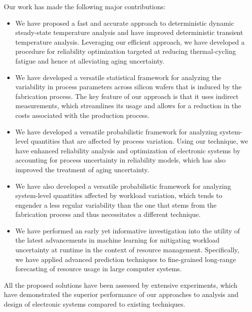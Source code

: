 Our work has made the following major contributions:

\begin{itemize}

\item
We have proposed a fast and accurate approach to deterministic dynamic
steady-state temperature analysis and have improved deterministic transient
temperature analysis. Leveraging our efficient approach, we have developed a
procedure for reliability optimization targeted at reducing thermal-cycling
fatigue and hence at alleviating aging uncertainty.

\item
We have developed a versatile statistical framework for analyzing the
variability in process parameters across silicon wafers that is induced by the
fabrication process. The key feature of our approach is that it uses indirect
measurements, which streamlines its usage and allows for a reduction in the
costs associated with the production process.

\item
We have developed a versatile probabilistic framework for analyzing system-level
quantities that are affected by process variation. Using our technique, we have
enhanced reliability analysis and optimization of electronic systems by
accounting for process uncertainty in reliability models, which has also
improved the treatment of aging uncertainty.

\item
We have also developed a versatile probabilistic framework for analyzing
system-level quantities affected by workload variation, which tends to engender
a less regular variability than the one that stems from the fabrication process
and thus necessitates a different technique.

\item
We have performed an early yet informative investigation into the utility of the
latest advancements in machine learning for mitigating workload uncertainty at
runtime in the context of resource management. Specifically, we have applied
advanced prediction techniques to fine-grained long-range forecasting of
resource usage in large computer systems.

\end{itemize}

All the proposed solutions have been assessed by extensive experiments, which
have demonstrated the superior performance of our approaches to analysis and
design of electronic systems compared to existing techniques.
